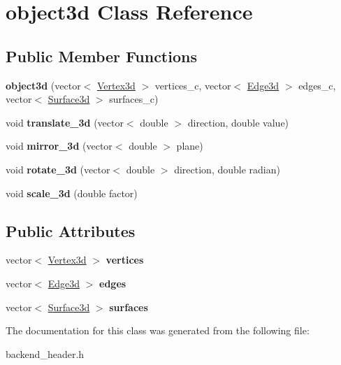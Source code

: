 \hypertarget{classobject3d}{}\section{object3d Class Reference}
\label{classobject3d}
\subsection*{Public Member Functions}
\begin{DoxyCompactItemize}
\item 
{\bfseries object3d} (vector$<$ \hyperlink{classVertex3d}{Vertex3d} $>$ vertices\+\_\+c, vector$<$ \hyperlink{classEdge3d}{Edge3d} $>$ edges\+\_\+c, vector$<$ \hyperlink{classSurface3d}{Surface3d} $>$ surfaces\+\_\+c)\hypertarget{classobject3d_a7ed942b90627e0dbf526ef9994e8c182}{}\label{classobject3d_a7ed942b90627e0dbf526ef9994e8c182}

\item 
void {\bfseries translate\+\_\+3d} (vector$<$ double $>$ direction, double value)\hypertarget{classobject3d_ae8b498e154077da23fe630d8c1ab5e99}{}\label{classobject3d_ae8b498e154077da23fe630d8c1ab5e99}

\item 
void {\bfseries mirror\+\_\+3d} (vector$<$ double $>$ plane)\hypertarget{classobject3d_ac09ec302c2e21ec0a51b8169347a8a1c}{}\label{classobject3d_ac09ec302c2e21ec0a51b8169347a8a1c}

\item 
void {\bfseries rotate\+\_\+3d} (vector$<$ double $>$ direction, double radian)\hypertarget{classobject3d_a86af8deddead81e682cdedcf1b3c3518}{}\label{classobject3d_a86af8deddead81e682cdedcf1b3c3518}

\item 
void {\bfseries scale\+\_\+3d} (double factor)\hypertarget{classobject3d_a5c889b19ad4dcd11c9bfa5e5c4042b00}{}\label{classobject3d_a5c889b19ad4dcd11c9bfa5e5c4042b00}

\end{DoxyCompactItemize}
\subsection*{Public Attributes}
\begin{DoxyCompactItemize}
\item 
vector$<$ \hyperlink{classVertex3d}{Vertex3d} $>$ {\bfseries vertices}\hypertarget{classobject3d_aa0d095ad6e321a6b3b7fc0d03305f9c0}{}\label{classobject3d_aa0d095ad6e321a6b3b7fc0d03305f9c0}

\item 
vector$<$ \hyperlink{classEdge3d}{Edge3d} $>$ {\bfseries edges}\hypertarget{classobject3d_a1faf7177578f0845f512712770c3f043}{}\label{classobject3d_a1faf7177578f0845f512712770c3f043}

\item 
vector$<$ \hyperlink{classSurface3d}{Surface3d} $>$ {\bfseries surfaces}\hypertarget{classobject3d_a91f9aa64272e9b66bd84842ca4a384a3}{}\label{classobject3d_a91f9aa64272e9b66bd84842ca4a384a3}

\end{DoxyCompactItemize}


The documentation for this class was generated from the following file\+:\begin{DoxyCompactItemize}
\item 
backend\+\_\+header.\+h\end{DoxyCompactItemize}
